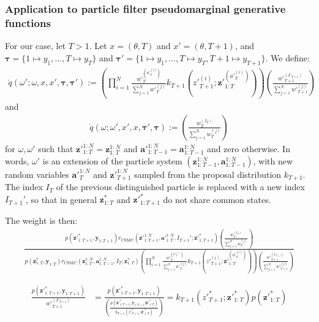 \documentclass[11pt]{article}
\newcommand{\z}{\mathbf{z}}
\newcommand{\abold}{\mathbf{a}}
\newcommand{\y}{\mathbf{y}}
\newcommand\tdict[0]{\boldsymbol{\tau}}
\begin{document}
\subsubsection{Application to particle filter pseudomarginal generative functions}
For our case, let $T > 1$.
Let $x = (\theta, T)$ and $x' = (\theta, T+1)$, and 
$\tdict = \{1 \mapsto y_1, \ldots, T \mapsto y_T\}$ and 
$\tdict' = \{1 \mapsto y_1, \ldots, T \mapsto y_T, T + 1 \mapsto y_{T+1}\}$.
We define:
\begin{align*}
 \mathring{q}(\omega'; \omega, x, x', \tdict, \tdict')
    := \left( \prod_{i=1}^N \frac{{w'}_{T}^{({a'}_{T}^{(i)})}}{\sum_{j=1}^N {w'}_{T}^{(j)}} k_{T+1}({z'}_{T+1}^{(i)}; {\z'}_{1:T}^{({a'}_{T}^{(i)})} ) \right)
        \left( \frac{{w'}_{T+1}^{(I'_{T+1})}}{\sum_{j=1}^N {w'}_{T+1}^{(j)}} \right)
\end{align*}
and 
\begin{align*}
 \mathring{q}(\omega; \omega', x', x, \tdict', \tdict)
    := \left( \frac{{w}_{T}^{(I_{T})}}{\sum_{j=1}^N {w}_{T}^{(j)}} \right)
\end{align*}
for $\omega, \omega'$ such that
${\z'}_{1:T}^{1:N} = {\z}_{1:T}^{1:N}$ and 
${\abold'}_{1:T-1}^{1:N} = {\abold}_{1:T-1}^{1:N}$
and zero otherwise.
In words, $\omega'$ is an extension of the particle system $(\z_{1:T-1}^{1:N}, \abold_{1:T-1}^{1:N})$, with new random variables ${\abold'}_{T}^{1:N}$ and ${\z'}_{T+1}^{1:N}$ sampled from the proposal distribution $k_{T+1}$.
The index $I_T$ of the previous distinguished particle is replaced with a new index $I_{T+1}'$, so that in general $\z_{1:T}^{*}$ and ${\z'}_{1:T+1}^{*}$ do not share common states.

The weight is then:
\begin{align*}
\frac{
    p({\z'}_{1:T+1}^*, \y_{1:T+1})
    r_{\mathrm{CSMC}}({\z'}_{1:T+1}^{1:N}, {\abold'}_{1:T}^{1:N}, I_{T+1}'; {\z'}_{1:T+1}^*)
    \left( \frac{{w}_{T}^{(I_{T})}}{\sum_{j=1}^N {w}_{T}^{(j)}} \right)
}{
    p(\z_{1:T}^*, \y_{1:T})
    r_{\mathrm{CSMC}}(\z_{1:T}^{1:N}, \abold_{1:T-1}^{1:N}, I_T; \z_{1:T}^*)
    \left( \prod_{i=1}^N \frac{{w'}_{T}^{({a'}_{T}^{(i)})}}{\sum_{j=1}^N {w'}_{T}^{(j)}} k_{T+1}({z'}_{T+1}^{(i)}; {\z'}_{1:T}^{({a'}_{T}^{(i)})} ) \right)
    \left( \frac{{w'}_{T+1}^{(I'_{T+1})}}{\sum_{j=1}^N {w'}_{T+1}^{(j)}} \right)
}
\end{align*}

\begin{align*}
\frac{p({\z'}_{1:T+1}^*, \y_{1:T+1})}{{w'}_{T+1}^{(I'_{T+1})}}
    &= \frac{p({\z'}_{1:T+1}^*, \y_{1:T+1})}
            {\left(\frac{p({\z'}_{1:T+1}^*, \y_{1:T+1} | {\z'}_{1:T}^*)}{k_{T+1}({z'}_{T+1}^{*}; {\z'}_{1:T}^{*})}\right)}
    = k_{T+1}({z'}_{T+1}^{*}; {\z'}_{1:T}^{*}) p({\z'}_{1:T}^*)
\end{align*}
\end{document}
